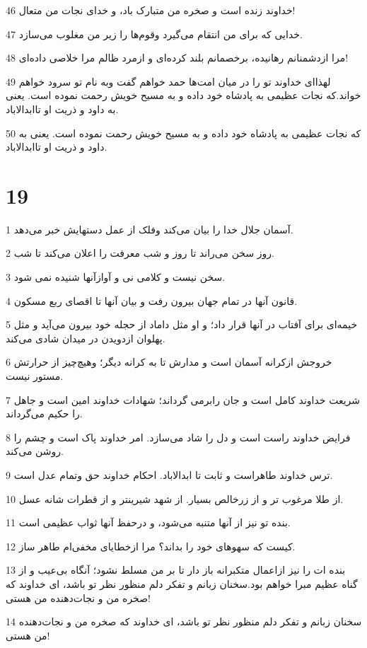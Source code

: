 \par 46 خداوند زنده است و صخره من متبارک باد، و خدای نجات من متعال!
\par 47 خدایی که برای من انتقام می‌گیرد وقوم‌ها را زیر من مغلوب می‌سازد.
\par 48 مرا ازدشمنانم رهانیده، برخصمانم بلند کرده‌ای و ازمرد ظالم مرا خلاصی داده‌ای!
\par 49 لهذا‌ای خداوند تو را در میان امت‌ها حمد خواهم گفت وبه نام تو سرود خواهم خواند.که نجات عظیمی به پادشاه خود داده و به مسیح خویش رحمت نموده است. یعنی به داود و ذریت او تاابدالاباد.
\par 50 که نجات عظیمی به پادشاه خود داده و به مسیح خویش رحمت نموده است. یعنی به داود و ذریت او تاابدالاباد.
 
\chapter{19}

\par 1 آسمان جلال خدا را بیان می‌کند وفلک از عمل دستهایش خبر می‌دهد.
\par 2 روز سخن می‌راند تا روز و شب معرفت را اعلان می‌کند تا شب.
\par 3 سخن نیست و کلامی نی و آوازآنها شنیده نمی شود.
\par 4 قانون آنها در تمام جهان بیرون رفت و بیان آنها تا اقصای ربع مسکون.
\par 5 خیمه‌ای برای آفتاب در آنها قرار داد؛ و او مثل داماد از حجله خود بیرون می‌آید و مثل پهلوان ازدویدن در میدان شادی می‌کند.
\par 6 خروجش ازکرانه آسمان است و مدارش تا به کرانه دیگر؛ وهیچ‌چیز از حرارتش مستور نیست.
\par 7 شریعت خداوند کامل است و جان رابرمی گرداند؛ شهادات خداوند امین است و جاهل را حکیم می‌گرداند.
\par 8 فرایض خداوند راست است و دل را شاد می‌سازد. امر خداوند پاک است و چشم را روشن می‌کند.
\par 9 ترس خداوند طاهراست و ثابت تا ابدالاباد. احکام خداوند حق وتمام عدل است.
\par 10 از طلا مرغوب تر و از زرخالص بسیار. از شهد شیرینتر و از قطرات شانه عسل.
\par 11 بنده تو نیز از آنها متنبه می‌شود، و درحفظ آنها ثواب عظیمی است.
\par 12 کیست که سهوهای خود را بداند؟ مرا ازخطایای مخفی‌ام طاهر ساز.
\par 13 بنده ات را نیز ازاعمال متکبرانه باز دار تا بر من مسلط نشود؛ آنگاه بی‌عیب و از گناه عظیم مبرا خواهم بود.سخنان زبانم و تفکر دلم منظور نظر تو باشد، ای خداوند که صخره من و نجات‌دهنده من هستی!
\par 14 سخنان زبانم و تفکر دلم منظور نظر تو باشد، ای خداوند که صخره من و نجات‌دهنده من هستی!
 
